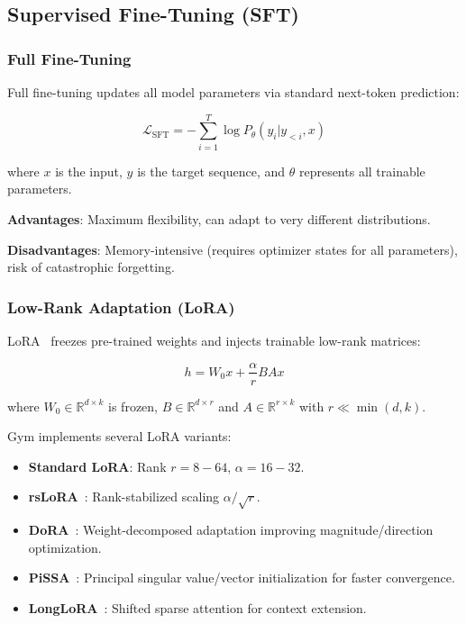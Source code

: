 \documentclass[11pt,letterpaper]{article}
\begin{document}
\subsection{Supervised Fine-Tuning (SFT)}

\subsubsection{Full Fine-Tuning}

Full fine-tuning updates all model parameters via standard next-token prediction:

\begin{equation}
\mathcal{L}_{\text{SFT}} = -\sum_{i=1}^{T} \log P_\theta(y_i | y_{<i}, x)
\end{equation}

where $x$ is the input, $y$ is the target sequence, and $\theta$ represents all trainable parameters.

\textbf{Advantages}: Maximum flexibility, can adapt to very different distributions.

\textbf{Disadvantages}: Memory-intensive (requires optimizer states for all parameters), risk of catastrophic forgetting.

\subsubsection{Low-Rank Adaptation (LoRA)}

LoRA~\citep{hu2021lora} freezes pre-trained weights and injects trainable low-rank matrices:

\begin{equation}
h = W_0 x + \frac{\alpha}{r} BA x
\end{equation}

where $W_0 \in \mathbb{R}^{d \times k}$ is frozen, $B \in \mathbb{R}^{d \times r}$ and $A \in \mathbb{R}^{r \times k}$ with $r \ll \min(d, k)$.

Gym implements several LoRA variants:

\begin{itemize}
\item \textbf{Standard LoRA}: Rank $r = 8-64$, $\alpha = 16-32$.
\item \textbf{rsLoRA}~\citep{kalajdzievski2023rslora}: Rank-stabilized scaling $\alpha/\sqrt{r}$.
\item \textbf{DoRA}~\citep{liu2024dora}: Weight-decomposed adaptation improving magnitude/direction optimization.
\item \textbf{PiSSA}~\citep{meng2024pissa}: Principal singular value/vector initialization for faster convergence.
\item \textbf{LongLoRA}~\citep{chen2023longlora}: Shifted sparse attention for context extension.
\end{itemize}
\end{document}
